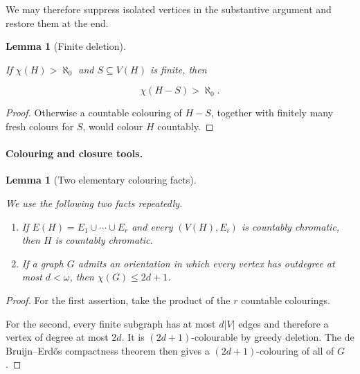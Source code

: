\documentclass[a4paper,11pt,reqno]{amsart}
\providecommand{\tightlist}{\setlength{\itemsep}{0pt}\setlength{\parskip}{0pt}}
\theoremstyle{plain}
\newtheorem{lemma}[theorem]{Lemma}
\theoremstyle{definition}
\theoremstyle{remark}
\begin{document}
We may therefore suppress isolated vertices in the substantive argument and
restore them at the end.

\begin{lemma}[Finite deletion]\label{lemma-1.2-finite-deletion}

If \(\chi(H)>\aleph_0\) and \(S\subseteq V(H)\) is finite, then

\[
\chi(H-S)>\aleph_0.
\]

\end{lemma}
\begin{proof}
Otherwise a countable colouring of \(H-S\), together with finitely many fresh colours for \(S\), would colour \(H\) countably.
\end{proof}

\paragraph{Colouring and closure tools.}\label{colouring-and-closure-tools}

\begin{lemma}[Two elementary colouring facts]\label{lemma-1.3-two-elementary-colouring-facts}

We use the following two facts repeatedly.

\begin{enumerate}
\def\labelenumi{\arabic{enumi}.}
\tightlist
\item
  If \(E(H)=E_1\cup\cdots\cup E_r\) and every \((V(H),E_i)\) is countably chromatic, then \(H\) is countably chromatic.
\item
  If a graph \(G\) admits an orientation in which every vertex has outdegree at most \(d<\omega\), then \(\chi(G)\le 2d+1\).
\end{enumerate}

\end{lemma}
\begin{proof}
For the first assertion, take the product of the \(r\) countable colourings.

For the second, every finite subgraph has at most \(d|V|\) edges and therefore a vertex of degree at most \(2d\). It is \((2d+1)\)-colourable by greedy deletion. The de Bruijn--Erdős compactness theorem \citep[Theorem~1]{debruijn1951} then gives a \((2d+1)\)-colouring of all of \(G\).
\end{proof}
\end{document}
